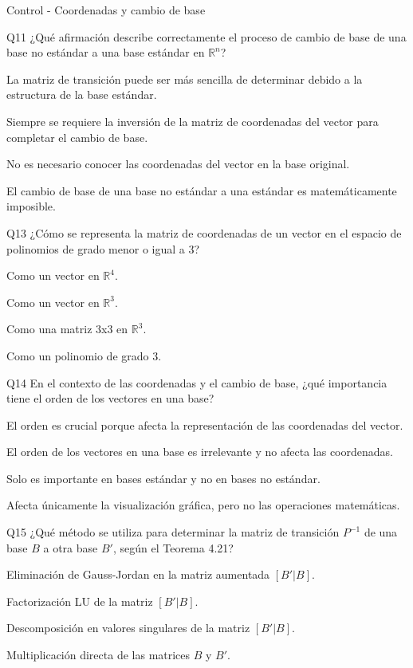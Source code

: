\documentclass[a4,11pt]{aleph-notas}
\begin{document}
\begin{quiz}{Control - Coordenadas y cambio de base}
\begin{multi}[]{Q11}
    ¿Qué afirmación describe correctamente el proceso de cambio de base de una base no estándar a una base estándar en $\mathbb{R}^n$?
    \item* La matriz de transición puede ser más sencilla de determinar debido a la estructura de la base estándar.
    \item Siempre se requiere la inversión de la matriz de coordenadas del vector para completar el cambio de base.
    \item No es necesario conocer las coordenadas del vector en la base original.
    \item El cambio de base de una base no estándar a una estándar es matemáticamente imposible.
\end{multi}

\begin{multi}[]{Q13}
    ¿Cómo se representa la matriz de coordenadas de un vector en el espacio de polinomios de grado menor o igual a 3?
    \item* Como un vector en $\mathbb{R}^4$.
    \item Como un vector en $\mathbb{R}^3$.
    \item Como una matriz 3x3 en $\mathbb{R}^3$.
    \item Como un polinomio de grado 3.
\end{multi}

\begin{multi}[]{Q14}
    En el contexto de las coordenadas y el cambio de base, ¿qué importancia tiene el orden de los vectores en una base?
    \item* El orden es crucial porque afecta la representación de las coordenadas del vector.
    \item El orden de los vectores en una base es irrelevante y no afecta las coordenadas.
    \item Solo es importante en bases estándar y no en bases no estándar.
    \item Afecta únicamente la visualización gráfica, pero no las operaciones matemáticas.
\end{multi}

\begin{multi}[]{Q15}
    ¿Qué método se utiliza para determinar la matriz de transición $P^{-1}$ de una base $B$ a otra base $B'$, según el Teorema 4.21?
    \item* Eliminación de Gauss-Jordan en la matriz aumentada $[B' | B]$.
    \item Factorización LU de la matriz $[B' | B]$.
    \item Descomposición en valores singulares de la matriz $[B' | B]$.
    \item Multiplicación directa de las matrices $B$ y $B'$.
\end{multi}


\end{quiz}
\end{document}
